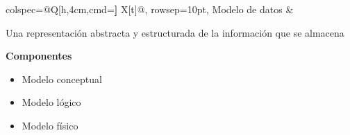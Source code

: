 \documentclass[letterpaper]{article}
\def \T{Bases de datos}
\def \S{Modelos de datos y normalización}
\begin{document}
\vspace{16pt}

\vspace{-1cm}
\begin{longtblr}{
    colspec={@{}Q[h,4cm,cmd=\textbf] X[t]@{}},
    rowsep={10pt},
  }
  Modelo de datos
  & 
  \begin{minipage}{\linewidth}
  Una representación abstracta y estructurada de la información que se almacena

  \bigskip
  {\bfseries{Componentes}}
  \begin{itemize}
    \item Modelo conceptual 
    \item Modelo lógico 
    \item Modelo físico
  \end{itemize}
  \end{minipage}
\end{longtblr}
\end{document}
